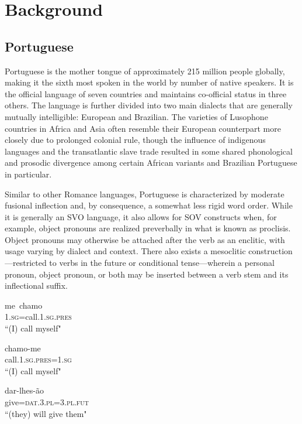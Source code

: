 
\section{Background}

\subsection{Portuguese}
\label{section:pt}

Portuguese is the mother tongue of approximately 215 million people globally, making it the sixth most spoken in the world by number of native speakers. It is the official language of seven countries and maintains co-official status in three others. The language is further divided into two main dialects that are generally mutually intelligible: European and Brazilian. The varieties of Lusophone countries in Africa and Asia often resemble their European counterpart more closely due to prolonged colonial rule, though the influence of indigenous languages and the transatlantic slave trade resulted in some shared phonological and prosodic divergence among certain African variants and Brazilian Portuguese in particular.

Similar to other Romance languages, Portuguese is characterized by moderate fusional inflection and, by consequence, a somewhat less rigid word order. While it is generally an SVO language, it also allows for SOV constructs when, for example, object pronouns are realized preverbally in what is known as proclisis. Object pronouns may otherwise be attached after the verb as an enclitic, with usage varying by dialect and context. There also exists a mesoclitic construction—restricted to verbs in the future or conditional tense—wherein a personal pronoun, object pronoun, or both may be inserted between a verb stem and its inflectional suffix.

\begin{exe}
\ex\label{pro}
\gll me\ chamo\\
{\scshape 1.sg}=call.{\scshape 1.sg.pres}\\
\glt ``(I) call myself" \citep{galves2005}

\ex\label{en}
\gll chamo-me\\
call.{\scshape 1.sg.pres}={\scshape 1.sg}\\
\glt ``(I) call myself" \citep{galves2005}

\ex\label{meso}
\gll dar-lhes-ão\\
give={\scshape dat.3.pl=3.pl.fut}\\
\glt ``(they) will give them" \citep{wetzels2018}
\end{exe}

